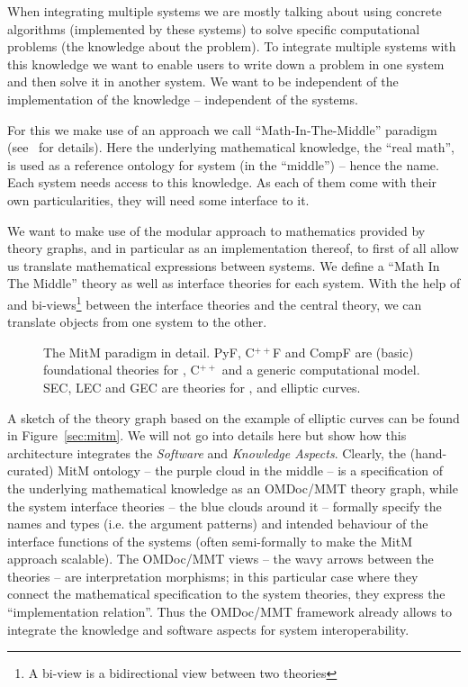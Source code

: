 When integrating multiple systems we are mostly talking about using concrete algorithms
(implemented by these systems) to solve specific computational problems (the knowledge
about the problem). To integrate multiple systems with this knowledge we want to enable
users to write down a problem in one system and then solve it in another system. We want
to be independent of the implementation of the knowledge -- independent of the systems.

For this we make use of an approach we call ``Math-In-The-Middle'' paradigm
(see~\cite{DehKohKon:iop16} for details). Here the underlying mathematical knowledge, the
``real math'', is used as a reference ontology for system (in the ``middle'') -- hence the
name. Each system needs access to this knowledge. As each of them come with their own
particularities, they will need some interface to it.

We want to make use of the modular approach to mathematics provided by theory graphs, and
in particular \MMT as an implementation thereof, to first of all allow us translate
mathematical expressions between systems. We define a ``Math In The Middle'' theory as
well as interface theories for each system. With the help of \MMT and bi-views\footnote{A
  bi-view is a bidirectional view between two theories} between the interface theories and
the central theory, we can translate objects from one system to the other.

\begin{figure}[ht]\centering
  \def\myxscale{3}\def\myyscale{1.2}
  
  \caption{The MitM paradigm in detail. PyF, C${}^{++}$F and CompF are (basic)
    foundational theories for \python, C${}^{++}$ and a generic computational model. SEC,
    LEC and GEC are theories for \SageMath, \LMFDB and \GAP elliptic curves.}\label{fig:mitm}
\end{figure}

A sketch of the theory graph based on the example of elliptic curves can be found in
Figure~\ref{sec:mitm}. We will not go into details here but show how this architecture
integrates the \emph{Software} and \emph{Knowledge Aspects}. Clearly, the (hand-curated)
MitM ontology -- the purple cloud in the middle -- is a specification of the underlying
mathematical knowledge as an OMDoc/MMT theory graph, while the system interface theories
-- the blue clouds around it -- formally specify the names and types (i.e. the argument
patterns) and intended behaviour of the interface functions of the systems (often
semi-formally to make the MitM approach scalable). The OMDoc/MMT views -- the wavy arrows
between the theories -- are interpretation morphisms; in this particular case where they
connect the mathematical specification to the system theories, they express the
``implementation relation''. Thus the OMDoc/MMT framework already allows to integrate the
knowledge and software aspects for system interoperability.

